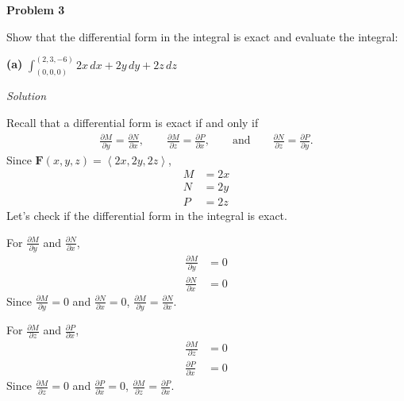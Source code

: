 \documentclass{article}
\newcommand{\lra}[1]{\left\langle #1 \right\rangle}
\newcommand{\F}[0]{\mathbf{F}}
\newcommand{\Solution}{\textit{Solution}}
\begin{document}
{}\textbf{Problem 3}

Show that the differential form in the integral is exact and evaluate the integral:

{}\textbf{(a)} $\displaystyle\int_{(0,0,0)}^{(2,3,-6)}2x\,dx+2y\,dy+2z\,dz$

\Solution

Recall that a differential form is exact if and only if
\begin{align*}
    \frac{\partial M}{\partial y}=\frac{\partial N}{\partial x},\hspace{2em}\frac{\partial M}{\partial z}=\frac{\partial P}{\partial x},\hspace{2em} \text{and}\hspace{2em}\frac{\partial N}{\partial z}=\frac{\partial P}{\partial y}.
\end{align*}
Since $\displaystyle\F(x,y,z)=\lra{2x,2y,2z}$, \begin{align*}
    M&=2x\\
    N&=2y\\
    P&=2z
\end{align*}
Let's check if the differential form in the integral is exact.

{}
For $\displaystyle \frac{\partial M}{\partial y}$ and $\displaystyle \frac{\partial N}{\partial x}$,
\begin{align*}
    \frac{\partial M}{\partial y}&=0\\
    \frac{\partial N}{\partial x}&=0
\end{align*}
Since $\displaystyle \frac{\partial M}{\partial y}=0$ and $\displaystyle \frac{\partial N}{\partial x}=0$, $\displaystyle \frac{\partial M}{\partial y}=\displaystyle \frac{\partial N}{\partial x}$.

{}
For $\displaystyle \frac{\partial M}{\partial z}$ and $\displaystyle\frac{\partial P}{\partial x}$,
\begin{align*}
    \frac{\partial M}{\partial z}&=0\\
    \frac{\partial P}{\partial x}&=0
\end{align*}
Since $\displaystyle \frac{\partial M}{\partial z}=0$ and $\displaystyle\frac{\partial P}{\partial x}=0$, $\displaystyle \frac{\partial M}{\partial z}=\displaystyle\frac{\partial P}{\partial x}$.
\end{document}
